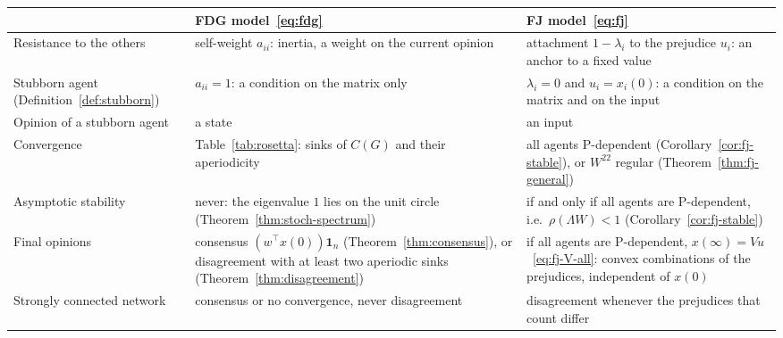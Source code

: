 

\begin{table}[H]
  \centering
  \small
  \renewcommand{\arraystretch}{1.1} %
  \begin{tabular}{@{}>{\raggedright\arraybackslash}p{2.9cm}
                  >{\raggedright\arraybackslash}p{6.5cm}
                  >{\raggedright\arraybackslash}p{6.75cm}@{}}
    \toprule
    & FDG model~\eqref{eq:fdg} & FJ model~\eqref{eq:fj} \\
    \midrule
    Resistance to the others
      & self-weight $a_{ii}$: inertia, a weight on the current opinion
      & attachment $1 - \lambda_i$ to the prejudice $u_i$: an anchor to a fixed value \\
    \midrule
    Stubborn agent (Definition~\ref{def:stubborn})
      & $a_{ii} = 1$: a condition on the matrix only
      & $\lambda_i = 0$ and $u_i = x_i(0)$: a condition on the matrix and on the input \\
    \midrule
    Opinion of a stubborn agent
      & a state
      & an input \\
    \midrule
    Convergence
      & Table~\ref{tab:rosetta}: sinks of $C(G)$ and their aperiodicity
      & all agents P-dependent (Corollary~\ref{cor:fj-stable}), or $W^{22}$ regular
        (Theorem~\ref{thm:fj-general}) \\
    \midrule
    Asymptotic stability
      & never: the eigenvalue $1$ lies on the unit circle
        (Theorem~\ref{thm:stoch-spectrum})
      & if and only if all agents are P-dependent, i.e.\ $\rho(\Lambda W) < 1$
        (Corollary~\ref{cor:fj-stable}) \\
    \midrule
    Final opinions
      & consensus $(w^\top x(0))\mathbf{1}_n$ (Theorem~\ref{thm:consensus}), or
        disagreement with at least two aperiodic sinks
        (Theorem~\ref{thm:disagreement})
      & if all agents are P-dependent, $x(\infty) = Vu$~\eqref{eq:fj-V-all}: convex
        combinations of the prejudices, independent of $x(0)$ \\
    \midrule
    Strongly connected network
      & consensus or no convergence, never disagreement
      & disagreement whenever the prejudices that count differ \\

\end{tabular}
\end{table}
